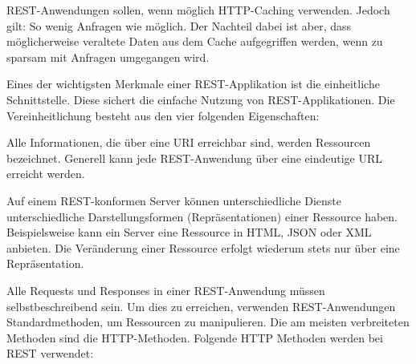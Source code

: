 
REST-Anwendungen sollen, wenn möglich HTTP-Caching verwenden. Jedoch gilt: So wenig Anfragen wie möglich. Der Nachteil dabei ist aber, dass möglicherweise veraltete Daten aus dem Cache aufgegriffen werden, wenn zu sparsam mit Anfragen umgegangen wird. \cite{WikiREST}


Eines der wichtigsten Merkmale einer REST-Applikation ist die einheitliche Schnittstelle. Diese sichert die einfache Nutzung von REST-Applikationen. Die Vereinheitlichung besteht aus den vier folgenden Eigenschaften:


Alle Informationen, die über eine URI erreichbar sind, werden Ressourcen bezeichnet. Generell kann jede REST-Anwendung über eine eindeutige URL erreicht werden. \cite{WikiREST}


Auf einem REST-konformen Server können unterschiedliche Dienste unterschiedliche Darstellungsformen (Repräsentationen) einer Ressource haben. Beispielsweise kann ein Server eine Ressource in HTML, JSON oder XML anbieten. Die Veränderung einer Ressource erfolgt wiederum stets nur über eine Repräsentation. \cite{WikiREST}


Alle Requests und Responses in einer REST-Anwendung müssen selbstbeschreibend sein. Um dies zu erreichen, verwenden REST-Anwendungen Standardmethoden, um Ressourcen zu manipulieren. Die am meisten verbreiteten Methoden sind die HTTP-Methoden. Folgende HTTP Methoden werden bei REST verwendet:

